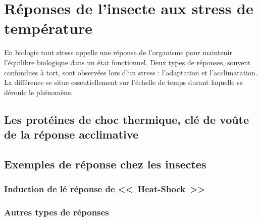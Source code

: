 \chapter{Réponses de l'insecte aux stress de température}

En biologie tout stress appelle une réponse de l'organisme pour maintenir l'équilibre biologique dans un état fonctionnel.
Deux types de réponses, souvent confondues à tort, sont observées lors d'un stress : l'adaptation et l'acclimatation.
La différence se situe essentiellement sur l'échelle de temps durant laquelle se déroule le phénomène.

	\section{Les protéines de choc thermique, clé de voûte de la réponse acclimative}

	\section{Exemples de réponse chez les insectes}

		\subsection{Induction de lé réponse de <<~Heat-Shock~>>}

		\subsection{Autres types de réponses} %

